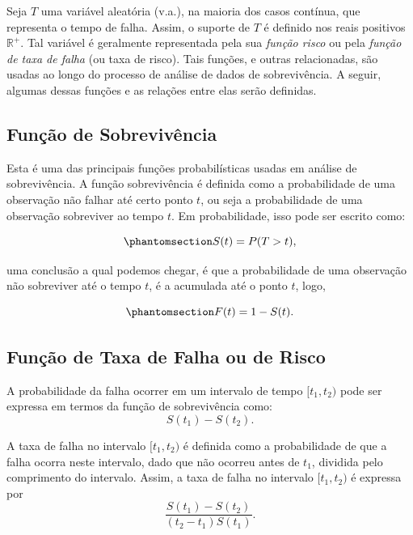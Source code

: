 \documentclass[
  12pt,
  letterpaper,
  DIV=11,
  numbers=noendperiod]{scrreprt}
\begin{document}
Seja \(T\) uma variável aleatória (v.a.), na maioria dos casos contínua,
que representa o tempo de falha. Assim, o suporte de \(T\) é definido
nos reais positivos \(\mathbb{R}^{+}\). Tal variável é geralmente
representada pela sua \emph{função risco} ou pela \emph{função de taxa
de falha} (ou taxa de risco). Tais funções, e outras relacionadas, são
usadas ao longo do processo de análise de dados de sobrevivência. A
seguir, algumas dessas funções e as relações entre elas serão definidas.

\subsection{Função de
Sobrevivência}\label{funuxe7uxe3o-de-sobrevivuxeancia}

Esta é uma das principais funções probabilísticas usadas em análise de
sobrevivência. A função sobrevivência é definida como a probabilidade de
uma observação não falhar até certo ponto \(t\), ou seja a probabilidade
de uma observação sobreviver ao tempo \(t\). Em probabilidade, isso pode
ser escrito como:

\begin{equation}\phantomsection\label{eq-fSobrevida}{
S(t) = P(T > t),
}\end{equation}

uma conclusão a qual podemos chegar, é que a probabilidade de uma
observação não sobreviver até o tempo \(t\), é a acumulada até o ponto
\(t\), logo,

\begin{equation}\phantomsection\label{eq-complfSobrevida}{
F(t) = 1 - S(t).
}\end{equation}

\subsection{Função de Taxa de Falha ou de
Risco}\label{funuxe7uxe3o-de-taxa-de-falha-ou-de-risco}

A probabilidade da falha ocorrer em um intervalo de tempo
\([t_{1}, t_{2})\) pode ser expressa em termos da função de
sobrevivência como: \[S(t_{1}) - S(t_{2}).\]

A taxa de falha no intervalo \([t_{1}, t_{2})\) é definida como a
probabilidade de que a falha ocorra neste intervalo, dado que não
ocorreu antes de \(t_{1}\), dividida pelo comprimento do intervalo.
Assim, a taxa de falha no intervalo \([t_{1}, t_{2})\) é expressa por
\[\dfrac{S(t_{1}) - S(t_{2})}{(t_{2} - t_{1})S(t_{1})}.\]
\end{document}
